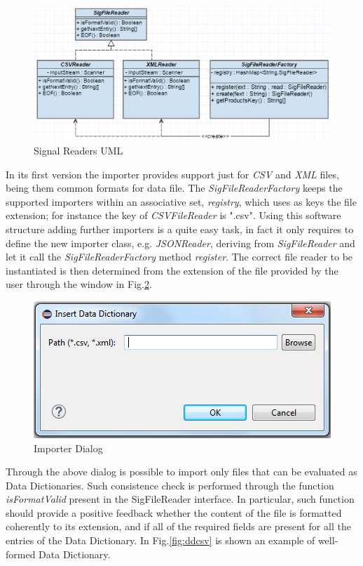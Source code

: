 \begin{figure}[!h]
\centering
\includegraphics[width=.9\textwidth]{Figs/ddimpUML.PNG}
\caption{Signal Readers UML}
\label{fig:ddimpuml}
\end{figure}
In its first version the importer provides support just for \textit{CSV} and \textit{XML} files, being them common formats for data file. The \textit{SigFileReaderFactory} keeps the supported importers within an associative set, \textit{registry}, which uses as keys the file extension; for instance the key of \textit{CSVFileReader} is ".csv". Using this software structure adding further importers is a quite easy task, in fact it only requires to define the new importer class, e.g. \textit{JSONReader}, deriving from \textit{SigFileReader} and let it call the \textit{SigFileReaderFactory} method \textit{register}. The correct file reader to be instantiated is then determined from the extension of the file provided by the user through the window in Fig.\ref{fig:ddwin}.

\begin{figure}[!h]
\centering
\includegraphics[width=.5\textwidth]{Figs/ddwin.PNG}
\caption{Importer Dialog}
\label{fig:ddwin}
\end{figure}
Through the above dialog is possible to import only files that can be evaluated as Data Dictionaries. Such consistence check is performed through the function \textit{isFormatValid} present in the SigFileReader interface. In particular, such function should provide a positive feedback whether the content of the file is formatted coherently to its extension, and if all of the required fields are present for all the entries of the Data Dictionary. In Fig.\ref{fig:ddcsv} is shown an example of well-formed Data Dictionary.

